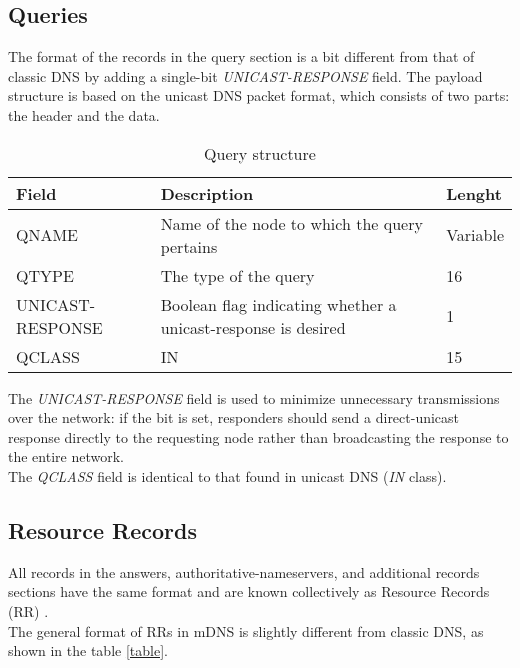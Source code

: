 \documentclass[fleqn, 10pt]{SelfArx} %
\begin{document}
\subsection{Queries}
The format of the records in the query section is a bit different from that of classic DNS by adding a single-bit {\it{UNICAST-RESPONSE}} field.
The payload structure is based on the unicast DNS packet format, which consists of two parts: the header and the data.

\begin{table}[hbt]
	\centering
	\begin{tabular}{|C{2cm}|C{2.8cm}|C{1.5cm}|}
		\hline
		Field & Description & Lenght \\
		\hline
		\hline
		QNAME & Name of the node to which the query pertains & Variable \\
		\hline
		QTYPE &	The type of the query &	16 \\
		\hline
		UNICAST-RESPONSE & Boolean flag indicating whether a unicast-response is desired & 1\\
		\hline
		QCLASS & IN & 15 \\
		\hline
	\end{tabular}
	\caption{Query structure}
\end{table}

The {\it{UNICAST-RESPONSE}} field is used to minimize unnecessary transmissions over the network: if the bit is set, responders should send a direct-unicast 
response directly to the requesting node rather than broadcasting the response to the entire network.\\
The {\it{QCLASS}} field is identical to that found in unicast DNS ({\it{IN}} class).

\subsection{Resource Records}
All records in the answers, authoritative-nameservers, and additional records sections have the same format and are known collectively as Resource Records (RR) \cite{rfc4034}.\\
The general format of RRs in mDNS is slightly different from classic DNS, as shown in the table \ref{table}. %
\end{document}
